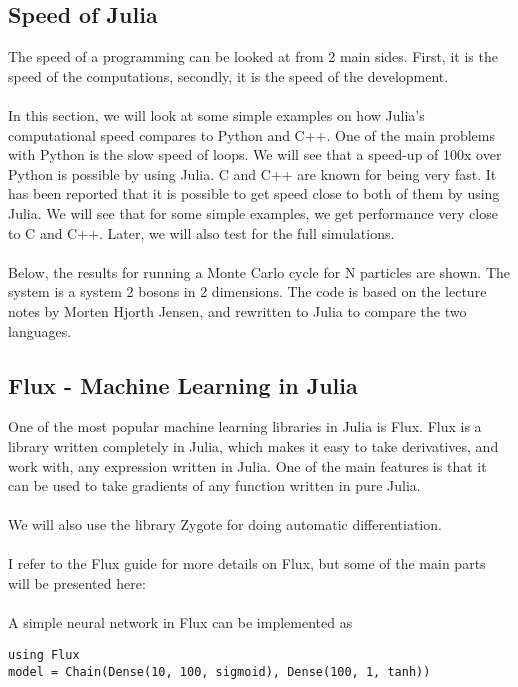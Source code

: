 \subsection{Speed of Julia}
The speed of a programming can be looked at from 2 main sides. First, it is the speed of the computations, secondly, it is the speed of the development.
\\
\\
In this section, we will look at some simple examples on how Julia's computational speed compares to Python and C++. One of the main problems with Python is the slow speed of loops. We will see that a speed-up of 100x over Python is possible by using Julia. C and C++ are known for being very fast. It has been reported that it is possible to get speed close to both of them by using Julia. We will see that for some simple examples, we get performance very close to C and C++. Later, we will also test for the full simulations. \\
\\
Below, the results for running a Monte Carlo cycle for N particles are shown. The system is a system 2 bosons in 2 dimensions. The code is based on the lecture notes by Morten Hjorth Jensen, and rewritten to Julia to compare the two languages. 

\subsection{Flux - Machine Learning in Julia}
One of the most popular machine learning libraries in Julia is Flux. Flux is a library written completely in Julia, which makes it easy to take derivatives, and work with, any expression written in Julia. One of the main features is that it can be used to take gradients of any function written in pure Julia. 
\\
\\
We will also use the library Zygote for doing automatic differentiation. 
\\
\\
I refer to the Flux guide for more details on Flux, but some of the main parts will be presented here: 
\\
\\
A simple neural network in Flux can be implemented as
\begin{lstlisting}
using Flux
model = Chain(Dense(10, 100, sigmoid), Dense(100, 1, tanh))
\end{lstlisting}
